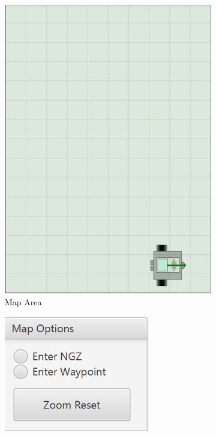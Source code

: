 \begin{figure}[H]
	\centering
	\begin{subfigure}[t]{0.4\textwidth}
		\includegraphics[width=0.95\linewidth]{MapArea.png}  
		\caption{Map Area}
		\label{fig:Map Area}                
	\end{subfigure}
	\begin{subfigure}[t]{0.25\textwidth}
		\includegraphics[width=0.95\linewidth]{MapOptions.png}  

\end{subfigure}
\end{figure}
